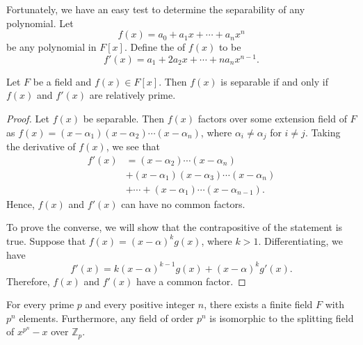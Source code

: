 Fortunately, we have an easy test to  determine the separability of any polynomial.  Let
\[
f(x) = a_0 + a_1 x + \cdots + a_n x^n
\]
be any polynomial in  $F[x]$. Define the  of $f(x)$ to be 
\[
f'(x) = a_1  + 2 a_2 x + \cdots + n a_n x^{n-1}.
\]

\begin{lemma}\label{finite:separable_derivative_lemma}
Let $F$ be a field and $f(x) \in F[x]$.  Then $f(x)$ is separable if and only if $f(x)$ and $f'(x)$ are relatively prime. 
\end{lemma}


\begin{proof}
Let $f(x)$ be separable.  Then $f(x)$ factors over some extension field of $F$ as $f(x) = (x - \alpha_1) (x - \alpha_2) \cdots (x - \alpha_n)$, where $\alpha_i \neq \alpha_j$ for $i \neq j$. Taking the derivative
of $f(x)$, we see that
\begin{align*}
f'(x) & =  (x - \alpha_2) \cdots (x - \alpha_n) \\
&  +  (x - \alpha_1) (x - \alpha_3) \cdots (x - \alpha_n) \\
&  + \cdots + (x - \alpha_1) \cdots (x - \alpha_{n - 1}).
\end{align*}
Hence, $f(x)$ and $f'(x)$ can have no common factors.

To prove the converse, we will show that the contrapositive of the statement is true.  Suppose that $f(x) = (x - \alpha)^k g(x)$, where $k > 1$.  Differentiating, we have
\[
f'(x) = k ( x - \alpha)^{k-1} g(x) + (x- \alpha)^k g'(x).
\]
Therefore, $f(x)$ and $f'(x)$ have a common factor.
\end{proof}


\begin{theorem}\label{finite:splitting_field_theorem}
For every  prime $p$ and every positive integer $n$, there exists a finite field $F$ with $p^n$ elements. Furthermore, any field of order $p^n$ is isomorphic to the splitting field of $x^{p^n} -x$ over ${\mathbb Z}_p$.
\end{theorem}
 

